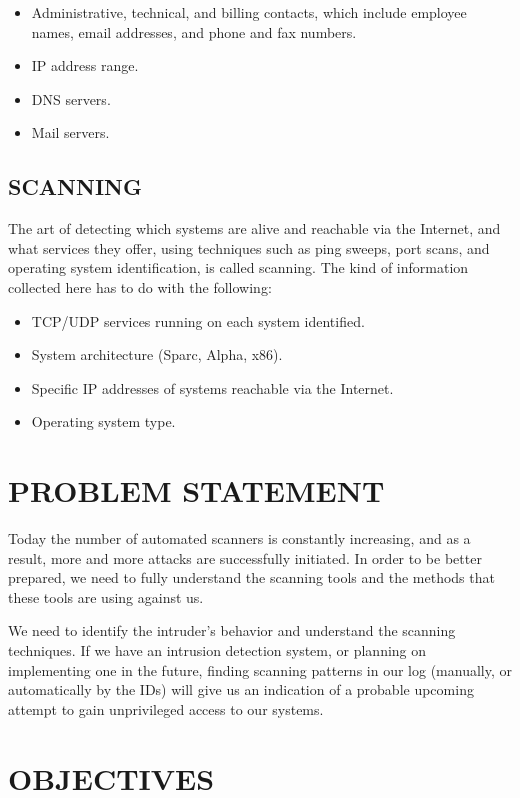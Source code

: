 \documentclass{article}
\begin{document}
\begin{itemize}
   	  \item Administrative, technical, and billing contacts, which include employee names, email
addresses, and phone and fax numbers.
	  \item IP address range.
	\item DNS servers.
	\item Mail servers.
	\end{itemize}

\subsection{SCANNING}\label{sec:into}
The art of detecting which systems are alive and reachable via the Internet, and
what services they offer, using techniques such as ping sweeps, port scans, and operating
system identification, is called scanning.
The kind of information collected here has to do with the following:

	\begin{itemize}
   	  \item TCP/UDP services running on each system identified.
	  \item System architecture (Sparc, Alpha, x86).
	\item Specific IP addresses of systems reachable via the Internet.
	\item Operating system type.
	\end{itemize}

\section{PROBLEM STATEMENT}\label{sec:into}

Today   the number of automated scanners is constantly increasing, and as a result, more and
more attacks are successfully initiated.
In order to be better prepared, we need to fully understand the scanning tools and the
methods that these tools are using against us.


We need to identify the intruder’s behavior and understand the scanning techniques. If we
have an intrusion detection system, or planning on implementing one in the future, finding
scanning patterns in our log (manually, or automatically by the IDs) will give us an indication
of a probable upcoming attempt to gain unprivileged access to our systems.

\section{OBJECTIVES}\label{sec:into}
\end{document}
